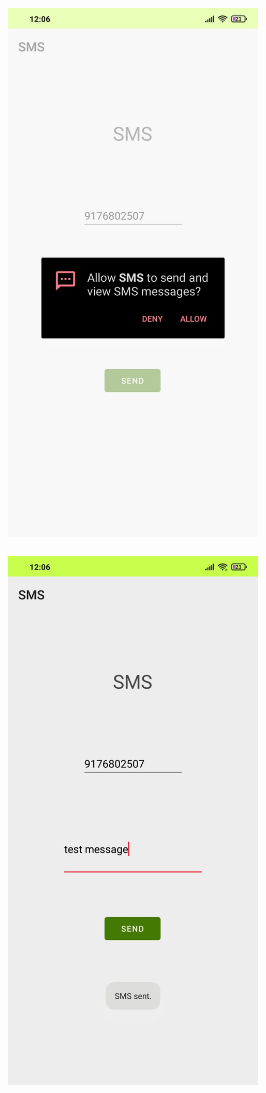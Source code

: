 \documentclass[12pt,letterpaper]{article}
\begin{document}
\begin{figure}
    \centering
    \includegraphics[height=14cm, keepaspectratio]{Outputs/OP3.png}
\end{figure}
\begin{figure}
    \centering
    \includegraphics[height=14cm, keepaspectratio]{Outputs/OP4.png}
\end{figure}
\end{document}
